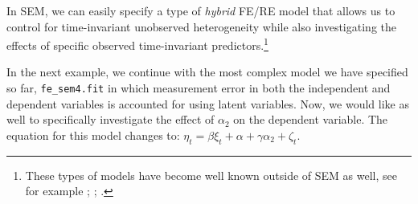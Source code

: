 \documentclass[]{interact}
\theoremstyle{plain}%
\theoremstyle{definition}
\theoremstyle{remark}
\begin{document}
In SEM, we can easily specify a type of \emph{hybrid} FE/RE model
\citep{Bollen2010} that allows us to control for time-invariant
unobserved heterogeneity while also investigating the effects of
specific observed time-invariant predictors.\footnote{These types of
  models have become well known outside of SEM as well, see for example
  \citet{Allison2011}; \citet{Schunck2013}; \citet{Bell2018}.}

In the next example, we continue with the most complex model we have
specified so far, \texttt{fe\_sem4.fit} in which measurement error in
both the independent and dependent variables is accounted for using
latent variables. Now, we would like as well to specifically investigate
the effect of \(\alpha_{2}\) on the dependent variable. The equation for
this model changes to:
\(\eta_{t} = \beta \xi_{t} + \alpha + \gamma \alpha_{2} + \zeta_{t}\).

\singlespacing
\end{document}
